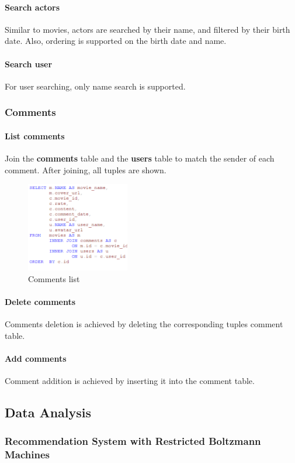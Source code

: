 \begin{CJK*}{UTF8}{gbsn}
\paragraph{Search actors}
Similar to movies, actors are searched by their name, and filtered by their birth date. Also, ordering is supported on the birth date and name.
\paragraph{Search user}
For user searching, only name search is supported.


\subsubsection{Comments}
\paragraph{List comments}
Join the \textbf{comments} table and the \textbf{users} table to match the sender of each comment. After joining, all tuples are shown. 
\begin{figure}[h]
    \centering
    \includegraphics[width=0.4\textwidth]{comment.png}
    \caption{Comments list}
\end{figure}
\paragraph{Delete comments} 
Comments deletion is achieved by deleting the corresponding tuples comment table.
\paragraph{Add comments} 
Comment addition is achieved by inserting it into the comment table.

\subsection{Data Analysis}
\subsubsection{Recommendation System with Restricted Boltzmann Machines}


\end{CJK*}
